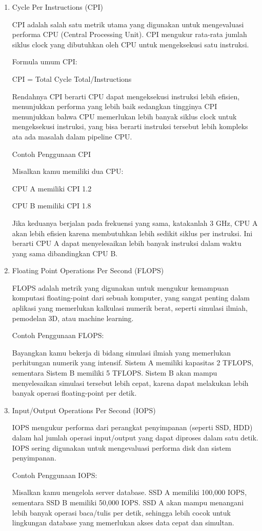 \documentclass[12pt]{article}
\begin{document}
\begin{enumerate}
    \item Cycle Per Instructions (CPI)
    \par CPI adalah salah satu metrik utama yang digunakan untuk mengevaluasi performa CPU (Central Processing Unit). CPI mengukur rata-rata jumlah siklus clock yang dibutuhkan oleh CPU untuk mengeksekusi satu instruksi.
    \par Formula umum CPI: 
    \par CPI = Total Cycle Total/Instructions
    \par Rendahnya CPI berarti CPU dapat mengeksekusi instruksi lebih efisien, menunjukkan performa yang lebih baik sedangkan tingginya CPI menunjukkan bahwa CPU memerlukan lebih banyak siklus clock untuk mengeksekusi instruksi, yang bisa berarti instruksi tersebut lebih kompleks ata ada masalah dalam pipeline CPU.
    \par Contoh Penggunaan CPI
    \par Misalkan kamu memiliki dua CPU: 
    \par CPU A memiliki CPI 1.2 
    \par CPU B memiliki CPI 1.8 
    \par Jika keduanya berjalan pada frekuensi yang sama, katakanlah 3 GHz, CPU A akan lebih efisien karena membutuhkan lebih sedikit siklus per instruksi. Ini berarti CPU A dapat menyelesaikan lebih banyak instruksi dalam waktu yang sama dibandingkan CPU B.

    \item Floating Point Operations Per Second (FLOPS)
    \par FLOPS adalah metrik yang digunakan untuk mengukur
    kemampuan komputasi floating-point dari sebuah
    komputer, yang sangat penting dalam aplikasi yang
    memerlukan kalkulasi numerik berat, seperti simulasi
    ilmiah, pemodelan 3D, atau machine learning.
    \par Contoh Penggunaan FLOPS:
    \par Bayangkan kamu bekerja di bidang simulasi ilmiah yang memerlukan perhitungan numerik yang intensif. Sistem A memiliki kapasitas 2 TFLOPS, sementara Sistem B memiliki 5 TFLOPS. Sistem B akan mampu menyelesaikan simulasi tersebut lebih cepat, karena dapat melakukan lebih banyak operasi floating-point per detik.

    \item Input/Output Operations Per Second (IOPS)
    \par IOPS mengukur performa dari perangkat penyimpanan (seperti SSD, HDD) dalam hal jumlah operasi input/output yang dapat diproses dalam satu detik. IOPS sering digunakan untuk mengevaluasi performa disk dan sistem penyimpanan.
    \par Contoh Penggunaan IOPS:
    \par Misalkan kamu mengelola server database. SSD A memiliki 100,000 IOPS, sementara SSD B memiliki 50,000 IOPS. SSD A akan mampu menangani lebih banyak operasi baca/tulis per detik, sehingga lebih cocok untuk lingkungan database yang memerlukan akses data cepat dan simultan.
    
\end{enumerate}
\end{document}
